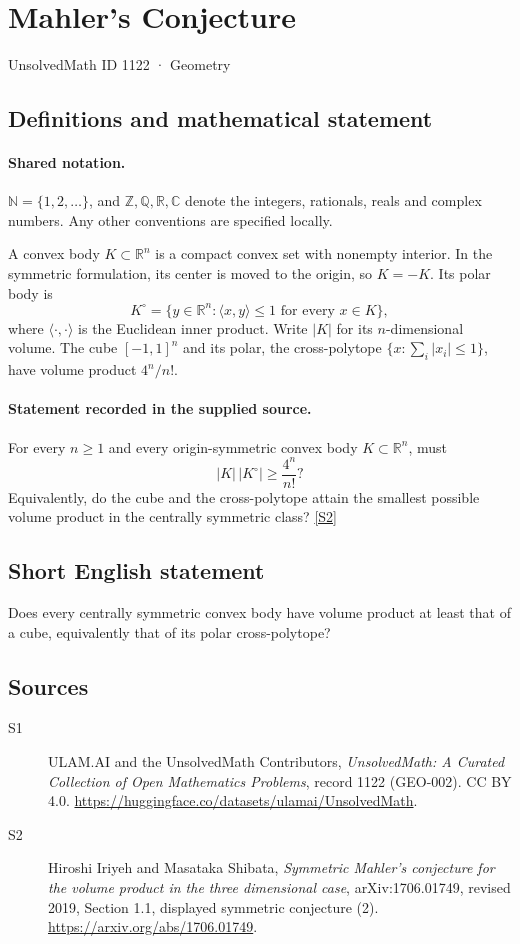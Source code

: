 \documentclass[11pt]{article}
\newcommand{\sref}[2]{\hyperlink{source:#1:#2}{[S#2]}}
\begin{document}
\setcounter{section}{1121}
\section{Mahler's Conjecture}\label{1122}
{\small\sffamily UnsolvedMath ID 1122 · Geometry}
\subsection{Definitions and mathematical statement}

\paragraph{Shared notation.}$\mathbb N=\{1,2,\ldots\}$, and $\mathbb Z,\mathbb Q,\mathbb R,\mathbb C$ denote the integers, rationals, reals and complex numbers. Any other conventions are specified locally.


A convex body \(K\subset\mathbb R^n\) is a compact convex set with
nonempty interior.  In the symmetric formulation, its center is moved
to the origin, so \(K=-K\).  Its polar body is
\[
 K^\circ=\{y\in\mathbb R^n:\langle x,y\rangle\le1
                           \text{ for every }x\in K\},
\]
where \(\langle\cdot,\cdot\rangle\) is the Euclidean inner product.
Write \(|K|\) for its \(n\)-dimensional volume.  The cube
\([-1,1]^n\) and its polar, the cross-polytope
\(\{x:\sum_i|x_i|\le1\}\), have volume product \(4^n/n!\).
\paragraph{Statement recorded in the supplied source.}
For every \(n\ge1\) and every origin-symmetric convex body
\(K\subset\mathbb R^n\), must
\[
 |K|\,|K^\circ|\ge\frac{4^n}{n!}?
\]
Equivalently, do the cube and the cross-polytope attain the smallest
possible volume product in the centrally symmetric class? \sref{1122}{2}
\subsection{Short English statement}
Does every centrally symmetric convex body have volume product at least that of a cube, equivalently that of its polar cross-polytope?
\subsection{Sources}
\begin{description}
\item[\hypertarget{source:1122:1}{S1}] ULAM.AI and the UnsolvedMath Contributors, \emph{UnsolvedMath: A Curated Collection of Open Mathematics Problems}, record 1122 (GEO-002). CC BY 4.0. \url{https://huggingface.co/datasets/ulamai/UnsolvedMath}.
\item[\hypertarget{source:1122:2}{S2}] Hiroshi Iriyeh and Masataka Shibata, \emph{Symmetric Mahler's conjecture for the volume product in the three dimensional case}, arXiv:1706.01749, revised 2019, Section 1.1, displayed symmetric conjecture (2). \url{https://arxiv.org/abs/1706.01749}.
\end{description}
\label{end:1122}
\end{document}
